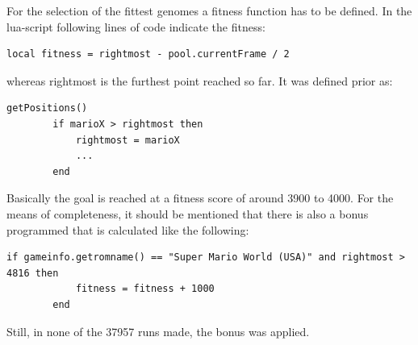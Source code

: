 		For the selection of the fittest genomes a fitness function has to be defined. In the \gls{lua}-script following lines of code indicate the fitness: 
		\lstset{style=myLuastyle} 
		\begin{lstlisting}[basicstyle=\tiny]
		local fitness = rightmost - pool.currentFrame / 2
		\end{lstlisting}
		whereas rightmost is the furthest point reached so far. It was defined prior as:
		\begin{lstlisting}[basicstyle=\tiny]
		getPositions()
		if marioX > rightmost then
			rightmost = marioX
			...
		end
		\end{lstlisting}
		Basically the goal is reached at a fitness score of around 3900 to 4000. For the means of completeness, it should be mentioned that there is also a bonus programmed that is calculated like the following:   
		\begin{lstlisting}[basicstyle=\tiny]
		if gameinfo.getromname() == "Super Mario World (USA)" and rightmost > 4816 then
			fitness = fitness + 1000
		end
		\end{lstlisting}
		Still, in none of the 37957 runs made, the bonus was applied.\\
		
